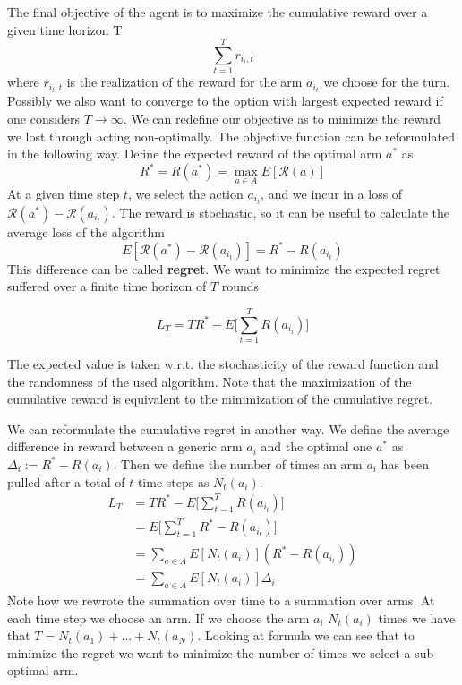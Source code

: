 \documentclass[main.tex]{subfiles}
\begin{document}
The final objective of the agent is to maximize the cumulative reward over a
given time horizon T
\begin{equation*}
    \sum_{t=1}^T r_{{i_t},t}
\end{equation*}
where $r_{{i_t},t}$ is the realization of the reward for the arm $a_{i_t}$ we choose for the turn. Possibly we also want to converge to the option with largest expected reward if one considers $T \rightarrow \infty$. We can redefine our objective as to minimize the reward we lost through acting non-optimally. The objective function can be reformulated in the following way. Define the expected reward of the optimal arm $a^*$ as
\begin{equation*}
    R^* = R(a^*) = \max_{a \in A} E[\mathcal{R}(a)]
\end{equation*}
At a given time step $t$, we select the action $a_{i_t}$, and we incur in a loss of $\mathcal{R}(a^*) - \mathcal{R}(a_{i_t})$. The reward is stochastic, so it can be useful to calculate the average loss of the algorithm
\begin{equation*}
    E[\mathcal{R}(a^*) - \mathcal{R}(a_{i_t})] = R^* - R(a_{i_t})
\end{equation*}
This difference can be called \textbf{regret}.
We want to minimize the expected regret suffered over a finite time horizon of $T$ rounds
\begin{definition}
\begin{equation*}
    L_T = TR^* - E \bigg[ \sum_{t=1}^T R(a_{i_t}) \bigg]
\end{equation*}
\end{definition}
\par \noindent
The expected value is taken w.r.t. the stochasticity of the reward function and the randomness of the used algorithm. Note that the maximization of the cumulative reward is equivalent to the minimization of the cumulative regret.

We can reformulate the cumulative regret in another way.
We define the average difference in reward between a generic arm $a_i$ and the optimal one $a^*$ as $\Delta_i := R^*-R(a_i)$. Then we define the number of times an arm $a_i$ has been pulled after a total of $t$ time steps as $N_t(a_i)$.
\begin{align*}
    L_T &= TR^* - E \bigg[ \sum_{t=1}^T R(a_{i_t}) \bigg] \\
    &= E \bigg[ \sum_{t=1}^T R^* - R(a_{i_t}) \bigg] \\
    &= \sum_{a \in A} E[N_t(a_i)](R^* - R(a_{i_t})) \\
    &= \sum_{a \in A} E[N_t(a_i)] \Delta_i
\end{align*}
Note how we rewrote the summation over time to a summation over arms. At each time step we choose an arm. If we choose the arm $a_i$ $N_t(a_i)$ times we have that $T= N_t(a_1) + \dots + N_t(a_N)$. Looking at formula we can see that to minimize the regret we want to minimize the number of times we select a sub-optimal arm.
\end{document}
